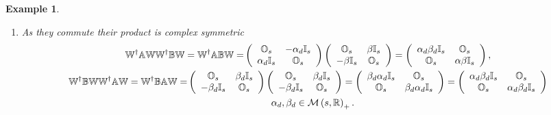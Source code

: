 \documentclass[aps,preprint]{revtex4}%
\newtheorem{example}[theorem]{Example}
\begin{document}
\begin{example}
\begin{enumerate}
\item As they commute their product is \emph{complex symmetric}
\begin{gather}
\mathbb{W}^{\dagger}\mathbb{AW\mathbb{W}^{\dagger}\mathbb{BW=W}^{\dagger
}\mathbb{A\mathbb{BW}}=}\left(
\begin{array}
[c]{cc}%
\mathbb{O}_{s} & -\mathbf{\alpha}_{d}\mathbb{I}_{s}\\
\mathbf{\alpha}_{d}\mathbb{I}_{s} & \mathbb{O}_{s}%
\end{array}
\right)  \left(
\begin{array}
[c]{cc}%
\mathbb{O}_{s} & \beta\mathbb{I}_{s}\\
-\beta\mathbb{I}_{s} & \mathbb{O}_{s}%
\end{array}
\right)  =\left(
\begin{array}
[c]{cc}%
\mathbf{\alpha}_{d}\mathbf{\beta}_{d}\mathbb{I}_{s} & \mathbb{O}_{s}\\
\mathbb{O}_{s} & \mathbf{\alpha\beta}\mathbb{I}_{s}%
\end{array}
\right)  ,\\
\mathbb{\mathbb{W}^{\dagger}\mathbb{BWW}^{\dagger}\mathbb{AW=W}^{\dagger
}\mathbb{BAW}=}\left(
\begin{array}
[c]{cc}%
\mathbb{O}_{s} & \mathbf{\beta}_{d}\mathbb{I}_{s}\\
-\mathbf{\beta}_{d}\mathbb{I}_{s} & \mathbb{O}_{s}%
\end{array}
\right)  \left(
\begin{array}
[c]{cc}%
\mathbb{O}_{s} & \mathbf{\beta}_{d}\mathbb{I}_{s}\\
-\mathbf{\beta}_{d}\mathbb{I}_{s} & \mathbb{O}_{s}%
\end{array}
\right)  =\left(
\begin{array}
[c]{cc}%
\mathbf{\beta}_{d}\mathbf{\alpha}_{d}\mathbb{I}_{s} & \mathbb{O}_{s}\\
\mathbb{O}_{s} & \mathbf{\beta}_{d}\mathbf{\alpha}_{d}\mathbb{I}_{s}%
\end{array}
\right)  =\left(
\begin{array}
[c]{cc}%
\mathbf{\alpha}_{d}\mathbf{\beta}_{d}\mathbb{I}_{s} & \mathbb{O}_{s}\\
\mathbb{O}_{s} & \mathbf{\alpha}_{d}\mathbf{\beta}_{d}\mathbb{I}_{s}%
\end{array}
\right) \\
\quad\mathbf{\alpha}_{d},\mathbf{\beta}_{d}\in\mathcal{M}\left(
s,\mathbb{R}\right)  _{+}.
\end{gather}

\end{enumerate}
\end{example}
\end{document}
